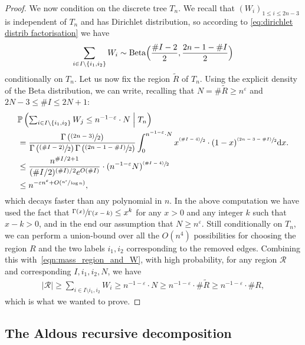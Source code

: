 \documentclass[11pt]{article}
\newcommand{\Subsection}{\subsection}
\newcommand{\psfrac}[2]{\sfrac{(#1)}{#2}}
\newcommand{\Ppsq}[2]{\mathbb{P} \left(#1\mathrel{}\middle|\mathrel{}#2\right)}
\newcommand{\Rr}{\mathcal{R}}
\let\eps\varepsilon
\theoremstyle{plain}
\theoremstyle{definition}
\numberwithin{equation}{section}
\begin{document}
\begin{proof}
We now condition on the discrete tree $T_n$. We recall that $(W_i)_{1\leq i \leq 2n-3}$ is independent of $T_n$ and has Dirichlet distribution, so according to \eqref{eq:dirichlet distrib factorisation} we have
\begin{align*}
\sum_{i\in I \setminus \{i_1,i_2\}} W_i
\sim \mathrm{Beta}\Bigl(\frac{\#I -2}{2},\frac{2n-1-\#I}{2}\Bigr)
\end{align*}
conditionally on $T_n$. Let us now fix the region $\tilde{R}$ of $T_n$. Using the explicit density of the $\mathrm{Beta}$ distribution, we can write, recalling that $N = \# \tilde{R} \geq n^\eps$ and $2N-3 \leq \# I \leq 2N+1$:
\begin{align*}
&\Ppsq{\textstyle\sum_{i\in I \setminus \{i_1,i_2\}} W_j \leq n^{-1-\eps}\cdot N}{T_n}\\
&= \frac{\Gamma\left(\psfrac{2n-3}{2}\right)}{\Gamma\left(\psfrac{\#I -2}{2}\right)\Gamma\left(\psfrac{2n-1-\#I}{2}\right)} \int_0^{n^{-1-\eps}\cdot N} x^{\psfrac{\#I -4}{2}} \cdot (1-x)^{\psfrac{2n-3-\#I}{2}} \mathrm{d}x.\\
&\leq \frac{n^{\#I/2+1}}{(\#I/2)^{(\#I)/2} e^{O(\#I)}} \cdot (n^{-1-\eps} N)^{\psfrac{\# I-4}{2}}\\
&\leq n^{-\eps n^{\eps}+O(\sfrac{n^\eps}{\log n})},
\end{align*}
which decays faster than any polynomial in $n$.
In the above computation we have used the fact that $\sfrac{\Gamma(x)}{\Gamma(x-k)}\leq x^k$ for any $x>0$ and any integer $k$ such that $x-k >0$, and in the end our assumption that $N\geq n^\eps$.
Still conditionally on $T_n$, we can perform a union-bound over all the $O(n^{4})$ possibilities for choosing the region $R$ and the two labels $i_1,i_2$ corresponding to the removed edges. Combining this with~\eqref{eqn:mass_region_and_W}, with high probability, for any region $\Rr$ and corresponding $I,i_1,i_2,N$, we have
\begin{align*}
|\Rr| \geq \sum_{i\in I\setminus {i_1,i_2}} W_i \geq n^{-1-\eps}\cdot N \geq n^{-1-\eps}\cdot \# \tilde{R} \geq n^{-1-\eps}\cdot \# R ,
\end{align*}
which is what we wanted to prove.
\end{proof}

\Subsection{The Aldous recursive decomposition}\label{subsec:aldous recursive decomposition}
\end{document}
